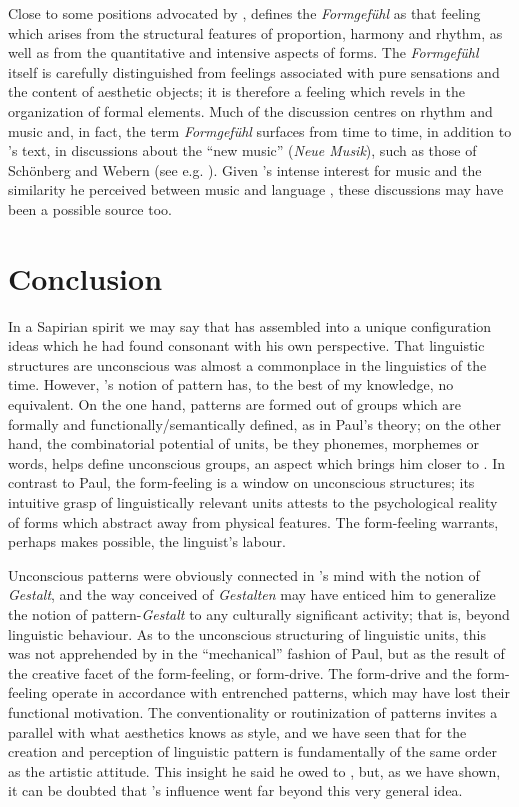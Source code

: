 \documentclass[output=paper]{langscibook}
\begin{document}
Close to some positions advocated by {\Lipps}, \citet{Dessoir1906} defines the \emph{Form\-gefühl} as that feeling which arises from the structural features of proportion, harmony and rhythm, as well as from the quantitative and intensive aspects of forms. The \emph{Formgefühl} itself is carefully distinguished from feelings associated with pure sensations and the content of aesthetic objects; it is therefore a feeling which revels in the organization of formal elements. Much of the discussion centres on rhythm and music and, in fact, the term \emph{Formgefühl} surfaces from time to time, in addition to {\Dessoir}'s text, in discussions about the ``new music'' (\emph{Neue Musik}), such as those of Schönberg and Webern (see e.g. \citealt{Webern1912}). Given {\Sapir}'s intense interest for music and the similarity he perceived between music and language \citep[156]{Darnell1990}, these discussions may have been a possible source too.

\section{Conclusion}
\label{sec:fortis:conc}

In a Sapirian spirit we may say that {\Sapir} has assembled into a unique configuration ideas which he had found consonant with his own perspective. That linguistic structures are unconscious was almost a commonplace in the linguistics of the time. However, {\Sapir}'s notion of pattern has, to the best of my knowledge, no equivalent. On the one hand, patterns are formed out of groups which are formally and functionally/semantically defined, as in Paul's theory; on the other hand, the combinatorial potential of units, be they phonemes, morphemes or words, helps define unconscious groups, an aspect which brings him closer to {\Bloomfield}. In contrast to Paul, the form-feeling is a window on unconscious structures; its intuitive grasp of linguistically relevant units attests to the psychological reality of forms which abstract away from physical features. The form-feeling warrants, perhaps makes possible, the linguist's labour.

Unconscious patterns were obviously connected in {\Sapir}'s mind with the notion of \emph{Gestalt}, and the way {\Koffka} conceived of \emph{Gestalten} may have enticed him to generalize the notion of pattern-\emph{Gestalt} to any culturally significant activity; that is, beyond linguistic behaviour. As to the unconscious structuring of linguistic units, this was not apprehended by {\Sapir} in the ``mechanical'' fashion of Paul, but as the result of the creative facet of the form-feeling, or form-drive. The form-drive and the form-feeling operate in accordance with entrenched patterns, which may have lost their functional motivation. The conventionality or routinization of patterns invites a parallel with what aesthetics knows as style, and we have seen that for {\Sapir} the creation and perception of linguistic pattern is fundamentally of the same order as the artistic attitude. This insight he said he owed to {\Croce}, but, as we have shown, it can be doubted that {\Croce}'s influence went far beyond this very general idea.
\end{document}
